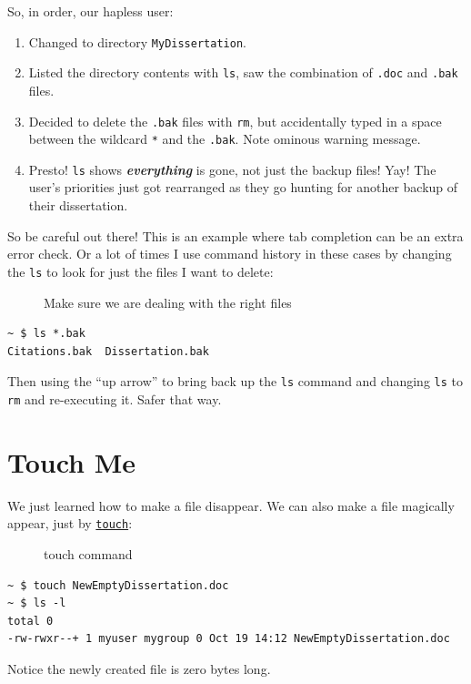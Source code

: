 \documentclass[10pt,]{book}
\numberwithin{figure}{chapter}
\DeclareRobustCommand{\drcap}[1]{\begin{figure}[H]\caption{#1}\end{figure}}
\DeclareRobustCommand{\drcmd}[1]{\index{Commands!#1}}
\begin{document}
So, in order, our hapless user:

\begin{enumerate}
\def\labelenumi{\arabic{enumi}.}
\item
  Changed to directory \texttt{MyDissertation}.
\item
  Listed the directory contents with \texttt{ls}, saw the combination of
  \texttt{.doc} and \texttt{.bak} files.
\item
  Decided to delete the \texttt{.bak} files with \texttt{rm}, but
  accidentally typed in a space between the wildcard \texttt{*} and the
  \texttt{.bak}. Note ominous warning message.
\item
  Presto! \texttt{ls} shows \textbf{\emph{everything}} is gone, not just
  the backup files! Yay! The user's priorities just got rearranged as
  they go hunting for another backup of their dissertation.
\end{enumerate}

So be careful out there! This is an example where tab completion can be
an extra error check. Or a lot of times I use command history in these
cases by changing the \texttt{ls} to look for just the files I want to
delete:

\drcap{Make sure we are dealing with the right files}

\begin{verbatim}
~ $ ls *.bak
Citations.bak  Dissertation.bak
\end{verbatim}

Then using the ``up arrow'' to bring back up the \texttt{ls} command and
changing \texttt{ls} to \texttt{rm} and re-executing it. Safer that way.

\section{Touch Me}\label{touch-me}

We just learned how to make a file disappear. We can also make a file
magically appear, just by
\href{http://linux.die.net/man/1/touch}{\texttt{touch}}\drcmd{touch}:

\drcap{touch command}

\begin{verbatim}
~ $ touch NewEmptyDissertation.doc
~ $ ls -l
total 0
-rw-rwxr--+ 1 myuser mygroup 0 Oct 19 14:12 NewEmptyDissertation.doc
\end{verbatim}

Notice the newly created file is zero bytes long.
\end{document}
